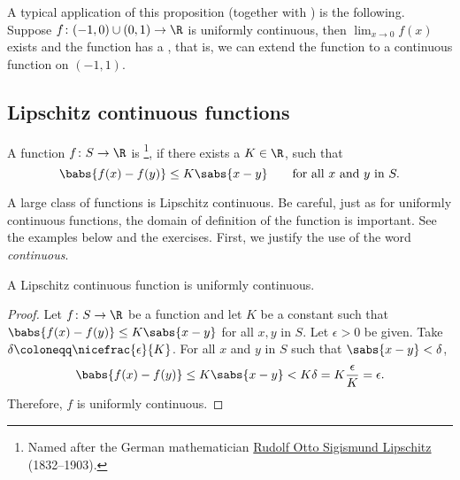 A typical application of this proposition (together with
)
is the following.
Suppose $f \colon (-1,0) \cup (0,1) \to \R$ is uniformly continuous,
then $\lim_{x\to 0} f(x)$ exists and the function
has a \emph{}, that is,
we can extend the function to a continuous function on $(-1,1)$.


\subsection{Lipschitz continuous functions}

\begin{defn}
A function $f \colon S \to \R$
is \emph{}%
\footnote{Named after the German mathematician
\href{https://en.wikipedia.org/wiki/Rudolf_Lipschitz}{Rudolf Otto Sigismund Lipschitz}
(1832--1903).}, if there exists a $K \in \R$, such that
\begin{equation*}
\babs{f(x)-f(y)} \leq K \sabs{x-y} 
\qquad \text{for all } x \text{ and } y \text{ in } S.
\end{equation*}
\end{defn}

A large class of functions is Lipschitz continuous.  Be careful, just as
for uniformly continuous functions, the
domain of definition of the function is important.  See the examples below
and the exercises.  First, we justify the use of the word \emph{continuous}.

\begin{prop}
A Lipschitz continuous function is uniformly continuous.
\end{prop}

\begin{proof}
Let $f \colon S \to \R$ be a function and let $K$ be a constant such that
$\babs{f(x)-f(y)} \leq K \sabs{x-y}$
for all $x, y$ in $S$.
Let $\epsilon > 0$ be given.  Take $\delta \coloneqq
\nicefrac{\epsilon}{K}$.
For all $x$ and $y$ in $S$ such that
$\sabs{x-y} < \delta$,
\begin{equation*}
\babs{f(x)-f(y)} \leq K \sabs{x-y} < K \delta = K \frac{\epsilon}{K} =
\epsilon .
\end{equation*}
Therefore, $f$ is uniformly continuous.
\end{proof}

